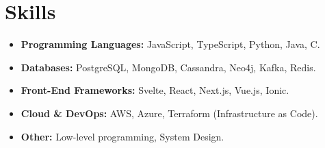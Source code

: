 \documentclass[11pt,a4paper,sans]{moderncv}
\begin{document}
\section{Skills}
    \begin{itemize}
        \item \textbf{Programming Languages:} JavaScript, TypeScript, Python, Java, C.
        \item \textbf{Databases:} PostgreSQL, MongoDB, Cassandra, Neo4j, Kafka, Redis.
        \item \textbf{Front-End Frameworks:} Svelte, React, Next.js, Vue.js, Ionic.
        \item \textbf{Cloud \& DevOps:} AWS, Azure, Terraform (Infrastructure as Code).
        \item \textbf{Other:} Low-level programming, System Design.
    \end{itemize}
\end{document}
